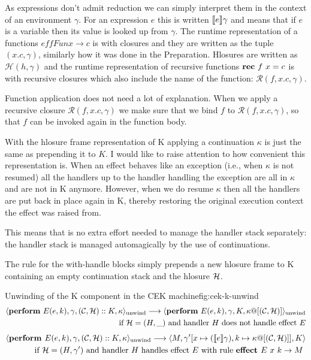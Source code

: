 \documentclass[class=article, crop=false]{standalone}
\begin{document}
As expressions don't admit reduction we can simply interpret them in the context of an environment $\gamma$. For an expression $e$
this is written $\llbracket e \rrbracket\gamma$ and means that if $e$ is a variable then its value is looked up from $\gamma$. The runtime representation
of a functions $effFun x \to c$ is with closures and they are written as the tuple $(x.c, \gamma)$, similarly how it was done in the Preparation. 
Hlosures are written as $\mathcal{H}(h, \gamma)$ and the runtime representation of recursive functions $\mathbf{rec}\  f\ x = c$ is with recursive
closures which also include the name of the function: $\mathcal{R}(f, x.c, \gamma)$.

Function application does not need a lot of explanation. When we apply a recursive closure $\mathcal{R}(f, x.c, \gamma)$ we make sure that we bind
$f$ to $\mathcal{R}(f, x.c, \gamma)$, so that $f$ can be invoked again in the function body. 

With the hlosure frame representation of K applying a continuation $\kappa$ is just the same as prepending it to $K$.
I would like to raise attention to how convenient this representation is. When an effect behaves like an exception (i.e., when $\kappa$ is not resumed)
all the handlers up to the handler handling the exception are all in $\kappa$ and are not in K anymore. However, when we do resume $\kappa$ then all
the handlers are put back in place again in K, thereby restoring the original execution context the effect was raised from.

This means that is no extra effort needed to manage the handler stack separately: the handler stack is managed automagically by the use of continuations.

The rule for the with-handle blocks simply prepends a new hlosure frame to K containing an empty continuation stack and the hlosure $\mathcal{H}$.

\begin{myfigure}[.95]{Unwinding of the K component in the CEK machine}{fig:cek-k-unwind}
    \begin{align*}
        \cek{ \effPerform E(e,k), \gamma, (\konts, \hlosure) :: K, \kappa}_\text{unwind} \longrightarrow
        \cek{ \effPerform E(e,k), \gamma, K, \kappa@[(\konts, \hlosure)] }_\text{unwind} \\
        \text{ if $\hlosure = (H, \_)$ and handler $H$ does not handle effect $E$}
        \end{align*}
        \begin{align*}
        \langle  \textbf{perform } E(e,k), \gamma, (\mathcal{C}, \mathcal{H}) :: K, \kappa \rangle_\text{unwind} \longrightarrow
        \langle  M, \gamma' [x \mapsto (\llbracket e \rrbracket\gamma), k \mapsto \kappa @ [(\mathcal{C}, \mathcal{H})]], K \rangle \\
        \text{ if $\mathcal{H} = (H, \gamma')$ and handler $H$ handles effect $E$ with rule $\textbf{effect } E\ x \ k \to M$ }
        \end{align*}
\end{myfigure}
\end{document}
